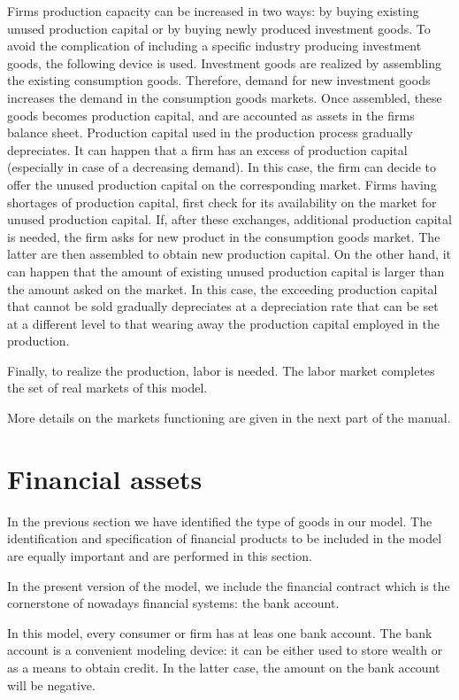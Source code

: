 \documentclass{book}
\begin{document}
Firms production capacity can be increased in two ways: by buying existing unused production capital or by buying newly produced investment goods. 
To avoid the complication of including a specific industry producing investment goods, the following device is used. Investment goods are realized by assembling the existing consumption goods. Therefore, demand for new investment goods increases the demand in the consumption goods markets. Once assembled, these goods becomes production capital, and are accounted as assets in the firms balance sheet. Production capital used in the production process gradually depreciates. It can happen that a firm has an excess of production capital (especially in case of a decreasing demand). In this case, the firm can decide to offer the unused production capital on the corresponding market. 
Firms having shortages of production capital, first check for its availability on the market for unused production capital. If, after these exchanges, additional production capital is needed, the firm asks for new product in the consumption goods market. The latter are then assembled to obtain new production capital. On the other hand, it can happen that the amount of existing unused production capital is larger than the amount asked on the market. In this case, the exceeding production capital that cannot be sold gradually depreciates at a depreciation rate that can be set at a different level to that wearing away the production capital employed in the production.

Finally, to realize the production, labor is needed.  The labor market completes the set of real markets of this model.  

More details on the markets functioning are given in the next part of the manual.

\clearpage
\section{Financial assets}

In the previous section we have identified the type of goods in our model. The identification and specification of financial products to be included in the model are equally important and are performed in this section. 

In the present version of the model, we include the financial contract which is the cornerstone of nowadays financial systems: the bank account.

In this model, every consumer or firm has at leas one bank account. The bank account is a convenient modeling device: it can be either used to store wealth or as a means to obtain credit. In the latter case, the amount on the bank account will be negative.
\end{document}
